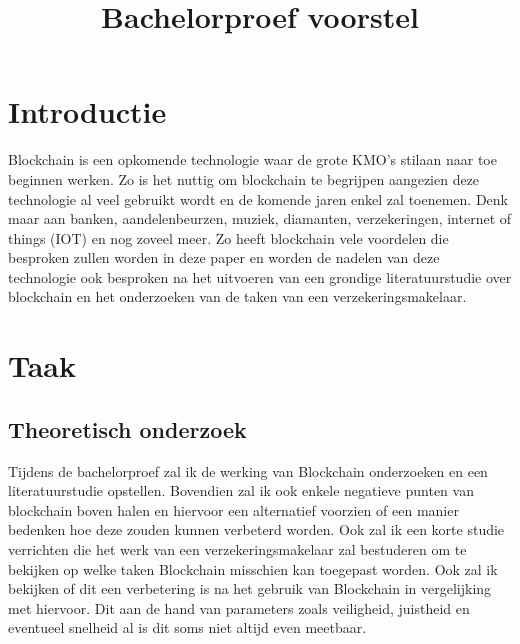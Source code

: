 \documentclass[fleqn,10pt]{voorstel}
\title{Bachelorproef voorstel}
\affiliation{\textbf{Contact:}
  \textsuperscript{1} \href{mailto:pieterjan.geeroms.u1457@student.hogent.be}{pieterjan.geeroms.u1457@student.hogent.be};
 }
\begin{document}
\flushbottom %
\maketitle %
\tableofcontents %
\thispagestyle{empty} %



\section{Introductie} %
\label{sec:introductie}


Blockchain is een opkomende technologie waar de grote KMO's stilaan naar toe beginnen werken. Zo is het nuttig om blockchain te begrijpen aangezien deze technologie al veel gebruikt wordt en de komende jaren enkel zal toenemen. Denk maar aan banken, aandelenbeurzen, muziek, diamanten, verzekeringen, internet of things (IOT) en nog zoveel meer. Zo heeft blockchain vele voordelen die besproken zullen worden in deze paper en worden de nadelen van deze technologie ook besproken na het uitvoeren van een grondige literatuurstudie over blockchain en het onderzoeken van de taken van een verzekeringsmakelaar.

\newpage
\section{Taak}
\label{sec:state-of-the-art}
\subsection{Theoretisch onderzoek}
Tijdens de bachelorproef zal ik de werking van Blockchain onderzoeken en een literatuurstudie opstellen. Bovendien zal ik ook enkele negatieve punten van blockchain boven halen en hiervoor een alternatief voorzien of een manier bedenken hoe deze zouden kunnen verbeterd worden. Ook zal ik een korte studie verrichten die het werk van een verzekeringsmakelaar zal bestuderen om te bekijken op welke taken Blockchain misschien kan toegepast worden. Ook zal ik bekijken of dit een verbetering is na het gebruik van Blockchain in vergelijking met hiervoor. Dit aan de hand van parameters zoals veiligheid, juistheid en eventueel snelheid al is dit soms niet altijd even meetbaar.
\end{document}
